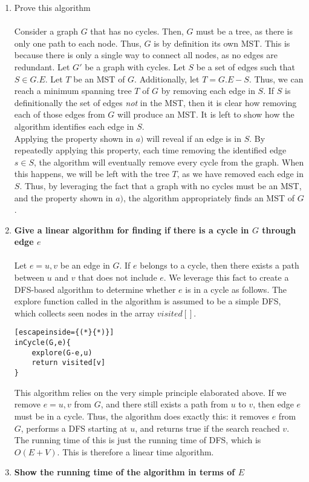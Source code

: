 \documentclass{article}
\begin{document}
\begin{enumerate}
\begin{enumerate}
	\item Prove this algorithm
	\\ \\ Consider a graph $G$ that has no cycles. Then, $G$ must be a tree, as there is only one path to each node. Thus, $G$ is by definition its own MST. This is because there is only a single way to connect all nodes, as no edges are redundant. Let $G'$ be a graph with cycles. Let $S$ be a set of edges such that $S \in G.E$. Let $T$ be an MST of $G$. Additionally, let $T = G.E - S$. Thus, we can reach a minimum spanning tree $T$ of $G$ by removing each edge in $S$. If $S$ is definitionally the set of edges \emph{not} in the MST, then it is clear how removing each of those edges from $G$ will produce an MST. It is left to show how the algorithm identifies each edge in $S$.
	\\ Applying the property shown in $a)$ will reveal if an edge is in $S$. By repeatedly applying this property, each time removing the identified edge $s \in S$, the algorithm will eventually remove every cycle from the graph. When this happens, we will be left with the tree $T$, as we have removed each edge in $S$. Thus, by leveraging the fact that a graph with no cycles must be an MST, and the property shown in $a)$, the algorithm appropriately finds an MST of $G$.
	\item \textbf{Give a linear algorithm for finding if there is a cycle in $G$ through edge $e$}
	\\\\ Let $e = u,v$ be an edge in $G$. If $e$ belongs to a cycle, then there exists a path between $u$ and $v$ that does not include $e$. We leverage this fact to create a DFS-based algorithm to determine whether $e$ is in a cycle as follows. The explore function called in the algorithm is assumed to be a simple DFS, which collects seen nodes in the array $visited[]$.
\begin{lstlisting}[escapeinside={(*}{*)}]
inCycle(G,e){
	explore(G-e,u)
	return visited[v]
}
\end{lstlisting}
This algorithm relies on the very simple principle elaborated above. If we remove $e = u,v$ from $G$, and there still exists a path from $u$ to $v$, then edge $e$ must be in a cycle. Thus, the algorithm does exactly this: it removes $e$ from $G$, performs a DFS starting at $u$, and returns true if the search reached $v$. The running time of this is just the running time of DFS, which is $O(E+V)$. This is therefore a linear time algorithm.
\item \textbf{Show the running time of the algorithm in terms of $E$}

\end{enumerate}
\end{enumerate}
\end{document}
